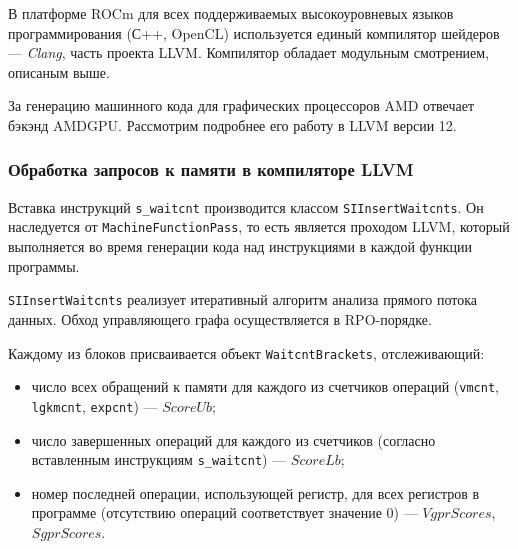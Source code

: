 \documentclass[a4paper,14pt]{extarticle}
\newenvironment{ul}{\begin{itemize}[noitemsep,topsep=0em]}{\end{itemize}\vspace{20pt}}
\begin{document}
В платформе ROCm для всех поддерживаемых высокоуровневых языков программирования (С++, OpenCL)
используется единый компилятор шейдеров — \textit{Clang}, часть проекта LLVM.
Компилятор обладает модульным смотрением, описаным выше.

За генерацию машинного кода для графических процессоров AMD отвечает бэкэнд AMDGPU.
Рассмотрим подробнее его работу в LLVM версии 12\cite{llvm-12}.

\subsubsection{Обработка запросов к памяти в компиляторе LLVM}
\label{section:gcn-waitcnt-llvm}

Вставка инструкций \texttt{s\_waitcnt} производится классом \texttt{SIInsertWaitcnts}.
Он наследуется от \texttt{MachineFunctionPass}, то есть является проходом LLVM,
который выполняется во время генерации кода над инструкциями в каждой функции программы.

\texttt{SIInsertWaitcnts} реализует итеративный алгоритм анализа прямого потока данных.
Обход управляющего графа осуществляется в RPO-порядке.

Каждому из блоков присваивается объект \texttt{WaitcntBrackets}, отслеживающий:
\begin{ul}
\item число всех обращений к памяти для каждого из счетчиков операций
  (\texttt{vmcnt}, \texttt{lgkmcnt}, \texttt{expcnt}) — $ScoreUb$;
\item число завершенных операций для каждого из счетчиков (согласно
  вставленным инструкциям \texttt{s\_waitcnt}) — $ScoreLb$;
\item номер последней операции, использующей регистр, для всех регистров
  в программе (отсутствию операций соответствует значение $0$) — $VgprScores$, $SgprScores$.
\end{ul}
\end{document}
